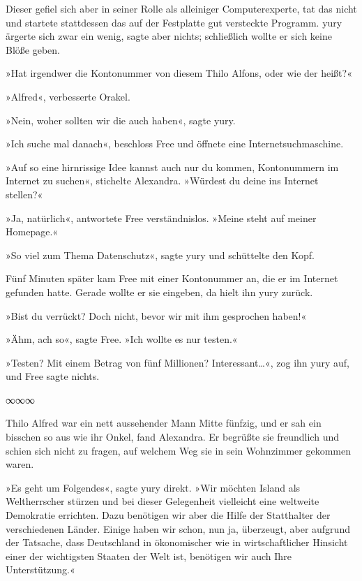 Dieser gefiel sich aber in seiner Rolle als alleiniger Computerexperte, tat das nicht und startete stattdessen das auf der Festplatte gut versteckte Programm. yury ärgerte sich zwar ein wenig, sagte aber nichts; schließlich wollte er sich keine Blöße geben.

»Hat irgendwer die Kontonummer von diesem Thilo Alfons, oder wie der heißt?«

»Alfred«, verbesserte Orakel.

»Nein, woher sollten wir die auch haben«, sagte yury.

»Ich suche mal danach«, beschloss Free und öffnete eine Internetsuchmaschine.

»Auf so eine hirnrissige Idee kannst auch nur du kommen, Kontonummern im Internet zu suchen«, stichelte Alexandra. »Würdest du deine ins Internet stellen?«

»Ja, natürlich«, antwortete Free verständnislos. »Meine steht auf meiner Homepage.«

»So viel zum Thema Datenschutz«, sagte yury und schüttelte den Kopf.

Fünf Minuten später kam Free mit einer Kontonummer an, die er im Internet gefunden hatte. Gerade wollte er sie eingeben, da hielt ihn yury zurück.

»Bist du verrückt? Doch nicht, bevor wir mit ihm gesprochen haben!«

»Ähm, ach so«, sagte Free. »Ich wollte es nur testen.«

»Testen? Mit einem Betrag von fünf Millionen? Interessant…«, zog ihn yury auf, und Free sagte nichts.

\begin{center}
    ∞∞∞
\end{center}

Thilo Alfred war ein nett aussehender Mann Mitte fünfzig, und er sah ein bisschen so aus wie ihr Onkel, fand Alexandra. Er begrüßte sie freundlich und schien sich nicht zu fragen, auf welchem Weg sie in sein Wohnzimmer gekommen waren.

»Es geht um Folgendes«, sagte yury direkt. »Wir möchten Island als Weltherrscher stürzen und bei dieser Gelegenheit vielleicht eine weltweite Demokratie errichten. Dazu benötigen wir aber die Hilfe der Statthalter der verschiedenen Länder. Einige haben wir schon, nun ja, überzeugt, aber aufgrund der Tatsache, dass Deutschland in ökonomischer wie in wirtschaftlicher Hinsicht einer der wichtigsten Staaten der Welt ist, benötigen wir auch Ihre Unterstützung.«

